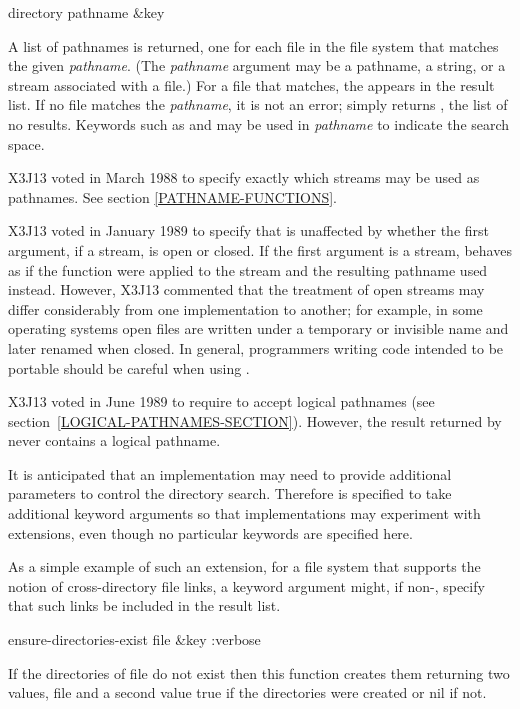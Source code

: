 \begin{defun}[Function]
directory pathname &key

A list of pathnames is returned, one for each
file in the file system that matches the given \emph{pathname}.
(The \emph{pathname} argument may be a pathname, a string,
or a stream associated with a file.)
For a file that matches, the  appears
in the result list.
If no file matches the \emph{pathname}, it is not an error;
 simply returns {\nil}, the list of no results.
Keywords such as  and  may
be used in \emph{pathname} to indicate the search space.

\begin{new}
X3J13 voted in March 1988
to specify exactly which streams may be used as pathnames.
See section \ref{PATHNAME-FUNCTIONS}.
\end{new}

\begin{new}
X3J13 voted in January 1989
to specify that  is unaffected by
whether the first argument, if a stream, is open or closed. If the first
argument is a stream,  behaves as if the function 
were applied to the stream and the resulting pathname used instead.
However, X3J13 commented that the treatment of open streams
may differ considerably from one implementation to another; for example,
in some operating systems open files are written under a temporary or
invisible name and later renamed when closed.  In general, programmers writing
code intended to be portable should be careful when using .
\end{new}

\begin{newer}
X3J13 voted in June 1989  to require 
to accept logical pathnames (see section~\ref{LOGICAL-PATHNAMES-SECTION}).
However, the result returned by  never contains a logical pathname.
\end{newer}

\beforenoterule
\begin{implementation}
It is anticipated that
an implementation may need to provide additional
parameters to control the directory search.  Therefore 
is specified to take additional keyword arguments so that implementations
may experiment with extensions,
even though no particular keywords are specified here.

As a simple example of such an extension, for a file system that
supports the notion of cross-directory file links,
a keyword argument  might, if non-{\nil},
specify that such links be included in the result list.
\end{implementation}
\afternoterule
\end{defun}

\begin{defun}[Function]
ensure-directories-exist file &key :verbose

If the directories of file do not exist then this function creates them
returning two values, file and a second value true if the directories were
created or nil if not.
\end{defun}

